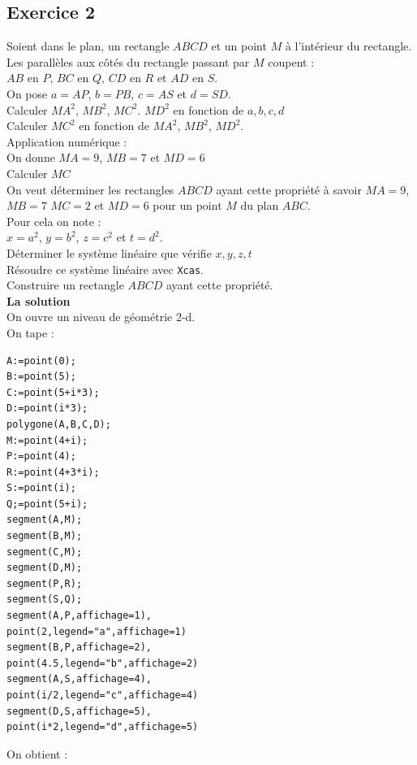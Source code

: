 \documentclass[a4paper,11pt]{book}
\begin{document}
\subsection{Exercice 2}
Soient dans le plan, un rectangle $ABCD$ et un point $M$ \`a l'int\'erieur 
du rectangle.\\
Les parall\`eles aux c\^ot\'es du rectangle passant par $M$ coupent :\\
$AB$ en $P$, $BC$ en $Q$, $CD$ en $R$ et $AD$ en $S$.\\
On pose $a=AP$, $b=PB$, $c=AS$ et $d=SD$.\\
Calculer $MA^2$, $MB^2$, $MC^2$. $MD^2$ en fonction de $a,b,c,d$\\
Calculer $MC^2$ en fonction de $MA^2$, $MB^2$, $MD^2$.\\
Application num\'erique :\\
On donne $MA=9$, $MB=7$ et $MD=6$\\
Calculer $MC$\\
On veut d\'eterminer les  rectangles $ABCD$ ayant cette propri\'et\'e \`a 
savoir $MA=9$, $MB=7$ $MC=2$ et $MD=6$ pour un point $M$ du plan $ABC$.\\ 
Pour cela on note :\\
$x=a^2$, $y=b^2$, $z=c^2$ et $t=d^2$.\\
D\'eterminer le syst\`eme lin\'eaire que v\'erifie $x,y,z,t$\\
R\'esoudre ce syst\`eme lin\'eaire avec {\tt Xcas}.\\
Construire un rectangle $ABCD$ ayant cette propri\'et\'e.\\
{\bf La solution}\\
On ouvre un niveau de g\'eom\'etrie 2-d.\\
On tape :\\
\begin{verbatim}
A:=point(0);
B:=point(5);
C:=point(5+i*3);
D:=point(i*3);
polygone(A,B,C,D);
M:=point(4+i);
P:=point(4);
R:=point(4+3*i);
S:=point(i);
Q;=point(5+i);
segment(A,M);
segment(B,M);
segment(C,M);
segment(D,M);
segment(P,R);
segment(S,Q);
segment(A,P,affichage=1),
point(2,legend="a",affichage=1)
segment(B,P,affichage=2),
point(4.5,legend="b",affichage=2)
segment(A,S,affichage=4),
point(i/2,legend="c",affichage=4)
segment(D,S,affichage=5),
point(i*2,legend="d",affichage=5)
\end{verbatim}
On obtient :\\
\end{document}
